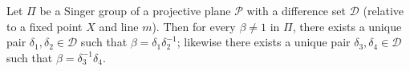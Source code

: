 Let $\Pi$ be a Singer group of a projective plane $\mathcal{P}$ with a difference set $\mathcal{D}$ (relative to a fixed point $X$ and line $m$). Then for every $\beta \neq 1$ in $\Pi$, there exists a unique pair $\delta_1, \delta_2 \in \mathcal{D}$ such that $\beta = \delta_1 \delta_2^{-1}$; likewise there exists a unique pair $\delta_3, \delta_4 \in \mathcal{D}$ such that $\beta = \delta_3^{-1} \delta_4$.
